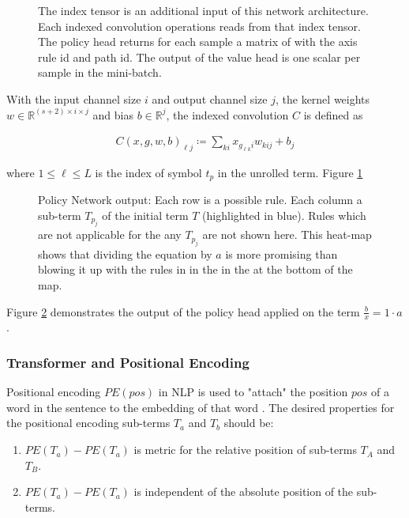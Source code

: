 \documentclass{scrartcl}
\theoremstyle{definition}
\begin{document}
\begin{figure}[!htbp]
	\centering
	
	\caption{The index tensor is an additional input of this network architecture.
		Each indexed convolution operations reads from that index tensor.
		The policy head returns for each sample a matrix of with the axis rule id and path id. 
		The output of the value head is one scalar per sample in the mini-batch. 
	}
	\label{fig:iconv_network}
\end{figure}

With the input channel size $i$ and output channel size $j$, the kernel weights $w \in \mathbb{R}^{\left( s+2 \right)\times i \times j}$ and bias $b \in \mathbb{R}^j$,
the indexed convolution $C$ is defined as

\begin{align}
	C\left( x, g, w, b \right)_{\ell j} \coloneqq \sum_{ki}x_{g_{\ell k}i} w_{kij}+b_j
\end{align}

where $1 \leq \ell \leq L$ is the index of symbol $t_p$ in the unrolled term. Figure \ref{fig:iconv_network}


\begin{figure}[!htbp]
	\centering
	
	\caption{Policy Network output: Each row is a possible rule. Each column a sub-term $T_{p_j}$ of the initial term $T$ (highlighted in blue).
	Rules which are not applicable for the any $T_{p_j}$ are not shown here.
	This heat-map shows that dividing the equation by $a$ is more promising than blowing it up with the rules in in the in the at the bottom of the map.}
	\label{fig:network_output}
\end{figure}

Figure \ref{fig:network_output} demonstrates the output of the policy head applied on the term $\frac{b}{x}=1\cdot a$ .

\subsubsection{Transformer and Positional Encoding}

Positional encoding $PE\left( pos\right)$ in NLP is used to "attach" the position $pos$ of a word in the sentence to the embedding of that word \cite{vaswani2017attention}.
The desired properties for the positional encoding sub-terms $T_a$ and $T_b$ should be:
\begin{enumerate}[label=(\roman*)]
	\item $PE\left( T_a \right) - PE\left( T_a \right)$ is metric for the relative position of sub-terms $T_A$ and $T_B$.
	\item $PE\left( T_a \right) - PE\left( T_a \right)$ is independent of the absolute position of the sub-terms.
\end{enumerate}
\end{document}
